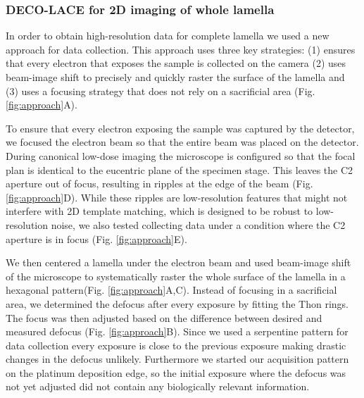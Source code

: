 \documentclass[
]{article}
\begin{document}
\hypertarget{deco-lace-for-2d-imaging-of-whole-lamella}{%
\subsubsection{DECO-LACE for 2D imaging of whole lamella}\label{deco-lace-for-2d-imaging-of-whole-lamella}}

In order to obtain high-resolution data for complete lamella we used a new
approach for data collection. This approach uses three key strategies: (1)
ensures that every electron that exposes the sample is collected on the camera
(2) uses beam-image shift to precisely and quickly raster the surface of the
lamella and (3) uses a focusing strategy that does not rely on a sacrificial
area (Fig. \ref{fig:approach}A).

To ensure that every electron exposing the sample was captured by the detector,
we focused the electron beam so that the entire beam was placed on the detector.
During canonical low-dose imaging the microscope is configured so that the focal
plan is identical to the eucentric plane of the specimen stage. This leaves the
C2 aperture out of focus, resulting in ripples at the edge of the beam (Fig. \ref{fig:approach}D). While these ripples are low-resolution features that might not interfere
with 2D template matching, which is designed to be robust to low-resolution
noise, we also tested collecting data under a condition where the C2 aperture is
in focus (Fig. \ref{fig:approach}E).

We then centered a lamella under the electron beam and used beam-image shift of
the microscope to systematically raster the whole surface of the lamella in a
hexagonal pattern(Fig. \ref{fig:approach}A,C). Instead of focusing in a sacrificial area, we determined the
defocus after every exposure by fitting the Thon rings. The focus was then adjusted based on the difference between
desired and measured defocus (Fig. \ref{fig:approach}B). Since we used a serpentine pattern for data
collection every exposure is close to the previous exposure making drastic
changes in the defocus unlikely. Furthermore we started our acquisition pattern
on the platinum deposition edge, so the initial exposure where the defocus was
not yet adjusted did not contain any biologically relevant information.
\end{document}
